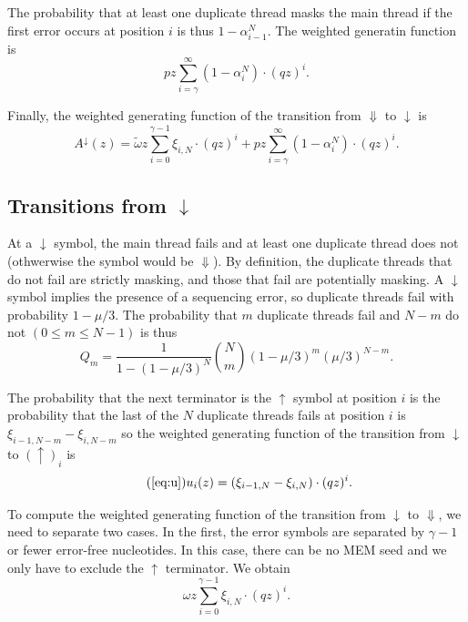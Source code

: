 \documentclass{article}
\begin{document}
The probability that at least one duplicate thread masks the main thread
if the first error occurs at position $i$ is thus $1 - \alpha_{i-1}^N$.
The weighted generatin function is
\begin{equation}
pz\sum_{i=\gamma}^\infty (1 - \alpha_i^N) \cdot (qz)^i.
\end{equation}

Finally, the weighted generating function of the transition from
$\Downarrow$ to $\downarrow$ is
\begin{equation}
A^\downarrow(z) =
\tilde{\omega} z \sum_{i=0}^{\gamma-1} \xi_{i,N} \cdot (qz)^i +
pz\sum_{i=\gamma}^\infty (1 - \alpha_i^N) \cdot (qz)^i.
\end{equation}

\subsection{Transitions from $\downarrow$}
\label{sec:trans_from_down}

At a $\downarrow$ symbol, the main thread fails and at least one duplicate
thread does not (othwerwise the symbol would be $\Downarrow$). By
definition, the duplicate threads that do not fail are strictly masking,
and those that fail are potentially masking. A $\downarrow$ symbol implies
the presence of a sequencing error, so duplicate threads fail with
probability $1-\mu/3$. The probability that $m$ duplicate threads fail and
$N-m$ do not $(0 \leq m \leq N-1)$ is thus
\begin{equation}
  Q_m = \frac{1}{1-(1-\mu/3)^N}{N \choose m} (1-\mu/3)^m(\mu/3)^{N-m}.
\end{equation}

The probability that the next terminator is the $\uparrow$ symbol at
position $i$ is the probability that the last of the $N$ duplicate threads
fails at position $i$ is $\xi_{i-1,N-m}-\xi_{i,N-m}$ so the weighted
generating function of the transition from $\downarrow$ to $(\uparrow)_i$
is
\begin{equation}
\tag{\ref{eq:u}}
u_i(z) = (\xi_{i-1,N}-\xi_{i,N}) \cdot (qz)^i.
\end{equation}

To compute the weighted generating function of the transition from
$\downarrow$ to $\Downarrow$, we need to separate two cases. In the first,
the error symbols are separated by $\gamma-1$ or fewer error-free
nucleotides. In this case, there can be no MEM seed and we only have to
exclude the $\uparrow$ terminator. We obtain
\begin{equation}
\omega z \sum_{i=0}^{\gamma-1}\xi_{i,N} \cdot (qz)^i.
\end{equation}
\end{document}
